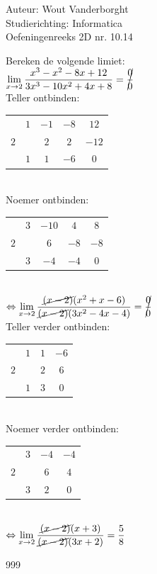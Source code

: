\documentclass[a4paper]{article}
\newcommand{\Limit}{\lim\limits_}
\begin{document}
  
\noindent \large Auteur: Wout Vanderborght\\
\noindent \large Studierichting: Informatica\\
\noindent \large Oefeningenreeks 2D nr. 10.14\\

\medskip

\normalsize

Bereken de volgende limiet: \\

$ \Limit{x \rightarrow 2} \dfrac{x^3-x^2-8x+12}{3x^3-10x^2+4x+8} = \cancel{\dfrac{0}{0}} $ \\

Teller ontbinden: \\

\begin{tabular}{c|ccc|c}
    & $1$ & $-1$ & $-8$ & $12$ \\
    $2$ & & $2$ & $2$ & $-12$ \\ \hline
    & $1$ & $1$ & $-6$ & $0$
\end{tabular} \\

Noemer ontbinden: \\

\begin{tabular}{c|ccc|c}
    & $3$ & $-10$ & $4$ & $8$ \\
    $2$ & & $6$ & $-8$ & $-8$ \\ \hline
    & $3$ & $-4$ & $-4$ & $0$
\end{tabular} \\

$ \Leftrightarrow \Limit{x \rightarrow 2} \dfrac{\cancel{(x-2)} (x^2+x-6)}{\cancel{(x-2)} (3x^2-4x-4)} = \cancel{\dfrac{0}{0}} $ \\

Teller verder ontbinden: \\

\begin{tabular}{c|cc|c}
    & $1$ & $1$ & $-6$ \\
    $2$ & & $2$ & $6$ \\ \hline
    & $1$ & $3$ & $0$
\end{tabular} \\

Noemer verder ontbinden: \\

\begin{tabular}{c|cc|c}
    & $3$ & $-4$ & $-4$ \\
    $2$ & & $6$ & $4$ \\ \hline
    & $3$ & $2$ & $0$
\end{tabular} \\

$ \Leftrightarrow \Limit{x \rightarrow 2} \dfrac{\cancel{(x-2)} (x+3)}{\cancel{(x-2)} (3x+2)} = \dfrac{5}{8} $ \\

\begin{thebibliography}{999}
\end{thebibliography}
\end{document}
